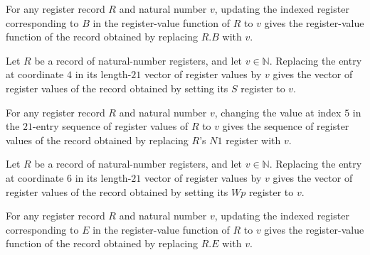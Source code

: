 \begin{lemma}
\label{Complexity.Codec.Regs.upd_B}
\leanok
{}
For any register record $R$ and natural number $v$, updating the indexed register
corresponding to $B$ in the register-value function of $R$ to $v$ gives the
register-value function of the record obtained by replacing $R.B$ with $v$.
\end{lemma}

\begin{lemma}
\label{Complexity.Codec.Regs.upd_S}
\leanok
{}
Let $R$ be a record of natural-number registers, and let $v\in\mathbb N$. Replacing the
entry at coordinate $4$ in its length-$21$ vector of register values by $v$ gives the
vector of register values of the record obtained by setting its $S$ register to $v$.
\end{lemma}

\begin{lemma}
\label{Complexity.Codec.Regs.upd_N1}
\leanok
{}
For any register record $R$ and natural number $v$, changing the value at index $5$ in
the $21$-entry sequence of register values of $R$ to $v$ gives the sequence of register
values of the record obtained by replacing $R$'s $N1$ register with $v$.
\end{lemma}

\begin{lemma}
\label{Complexity.Codec.Regs.upd_Wp}
\leanok
{}
Let $R$ be a record of natural-number registers, and let $v\in\mathbb N$. Replacing the
entry at coordinate $6$ in its length-$21$ vector of register values by $v$ gives the
vector of register values of the record obtained by setting its $Wp$ register to $v$.
\end{lemma}

\begin{lemma}
\label{Complexity.Codec.Regs.upd_E}
\leanok
{}
For any register record $R$ and natural number $v$, updating the indexed register
corresponding to $E$ in the register-value function of $R$ to $v$ gives the
register-value function of the record obtained by replacing $R.E$ with $v$.
\end{lemma}

